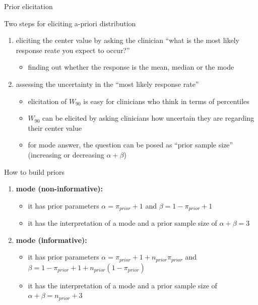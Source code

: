 \documentclass{beamer}
\begin{document}
\begin{frame}{Prior elicitation}

Two steps for eliciting a-priori distribution

\begin{enumerate}
\def\labelenumi{\arabic{enumi}.}
\itemsep1pt\parskip0pt
\item
  eliciting the center value by asking the clinician ``what is the most
  likely response reate you expect to occur?''

  \begin{itemize}
  \itemsep1pt\parskip0pt
  \item
    finding out whether the response is the mean, median or the mode
  \end{itemize}
\item
  assessing the uncertainty in the ``most likely response rate''

  \begin{itemize}
  \itemsep1pt\parskip0pt
  \item
    elicitation of \(W_{90}\) is easy for clinicians who think in terms
    of percentiles
  \item
    \(W_{90}\) can be elicited by asking clinicians how uncertain they
    are regarding their center value
  \item
    for mode answer, the question can be posed as ``prior sample size''
    (increasing or decreasing \(\alpha + \beta\))
  \end{itemize}
\end{enumerate}

\end{frame}

\begin{frame}{How to build priors}

\begin{enumerate}
\def\labelenumi{\arabic{enumi}.}
\item
  \textbf{mode (non-informative):}

  \begin{itemize}
  \itemsep1pt\parskip0pt
  \item
    it has prior parameters \(\alpha = \pi_{prior}+1\) and
    \(\beta = 1-\pi_{prior}+1\)
  \item
    it has the interpretation of a mode and a prior sample size of
    \(\alpha+\beta=3\)
  \end{itemize}
\item
  \textbf{mode (informative):}

  \begin{itemize}
  \itemsep1pt\parskip0pt
  \item
    it has prior parameters
    \(\alpha = \pi_{prior}+1+n_{prior}\pi_{prior}\) and
    \(\beta = 1-\pi_{prior}+1+n_{prior}(1-\pi_{prior})\)
  \item
    it has the interpretation of a mode and a prior sample size of
    \(\alpha+\beta=n_{prior}+3\)
  \end{itemize}
\end{enumerate}

\end{frame}
\end{document}
